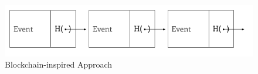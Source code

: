 \begin{figure}[ht]
\begin{center}
\includegraphics[width=15cm]{figures/consistency-1}
\end{center}
\caption{Blockchain-inspired Approach}
\label{fig:consistency-1}
\end{figure}
